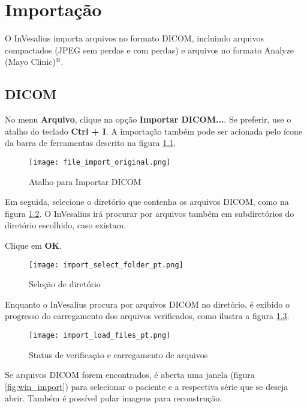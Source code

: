 \chapter{Importação}

O InVesalius importa arquivos no formato DICOM, incluindo arquivos compactados (JPEG sem perdas e
com perdas) e arquivos no formato Analyze (Mayo Clinic)$^\copyright$.

\section{DICOM}

No menu \textbf{Arquivo}, clique na opção \textbf{Importar DICOM...}. Se preferir, use o atalho
do teclado \textbf{Ctrl + I}. A importação também pode ser acionada pelo ícone da barra de ferramentas
descrito na figura \ref{fig:import}.

\begin{figure}[!htb]
\centering
\texttt{[image: file\_import\_original.png]}
\caption{Atalho para Importar DICOM}
\label{fig:import}
\end{figure}

\hspace{.2cm}

Em seguida, selecione o diretório que contenha os arquivos DICOM, como na figura \ref{fig:win_folder}.
O InVesalius irá procurar por arquivos também em subdiretórios do diretório escolhido, caso existam.

\newpage

Clique em \textbf{OK}.

\begin{figure}[!htb]
\centering
\texttt{[image: import\_select\_folder\_pt.png]}
\caption{Seleção de diretório}
\label{fig:win_folder}
\end{figure}

\hspace{.2cm}

Enquanto o InVesalius procura por arquivos DICOM no diretório, é exibido o progresso
do carregamento dos arquivos verificados, como ilustra a figura \ref{fig:ver_file}.

\begin{figure}[!htb]
\centering
\texttt{[image: import\_load\_files\_pt.png]}
\caption{Status de verificação e carregamento de arquivos}
\label{fig:ver_file}
\end{figure}

\newpage

Se arquivos DICOM forem encontrados, é aberta uma janela (figura \ref{fig:win_import})
para selecionar o paciente e a respectiva série que se deseja abrir. Também é possível
pular imagens para reconstrução.

